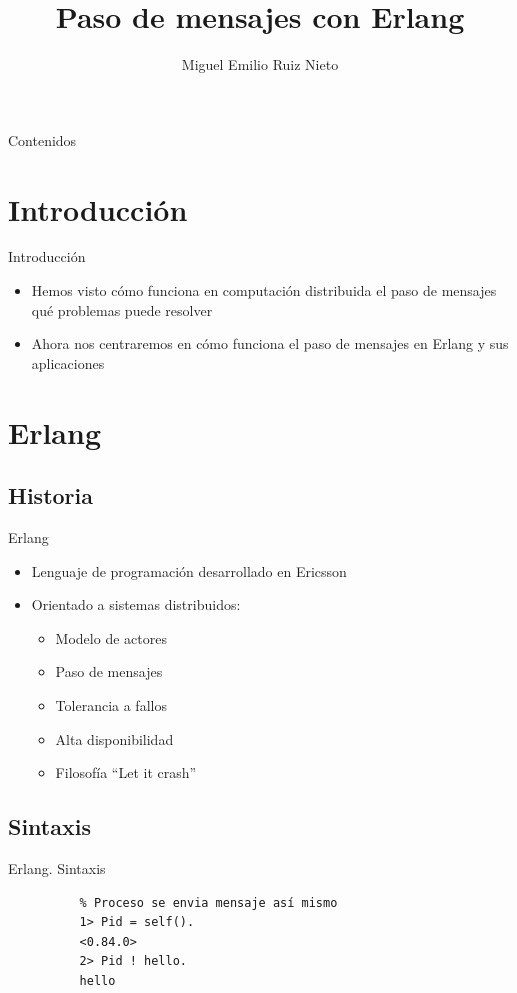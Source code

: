 \documentclass{beamer}
\title[CAP]{Paso de mensajes con Erlang}
\author[M. Ruiz (UCM)]{Miguel Emilio Ruiz Nieto}
\date{\mydate}
\begin{document}
  \begin{frame}
    \titlepage
  \end{frame}

  \begin{frame}{Contenidos}
    \tableofcontents[hideallsubsections]
  \end{frame}

  \section{Introducción}
  \begin{frame}{Introducción}
    \begin{itemize}
      \item Hemos visto cómo funciona en computación distribuida el paso de
      mensajes qué problemas puede resolver
      \item Ahora nos centraremos en cómo funciona el paso de mensajes en Erlang
      y sus aplicaciones
    \end{itemize}
  \end{frame}

  \section{Erlang}
    \subsection{Historia}
      \begin{frame}{Erlang}
        \begin{itemize}
          \item Lenguaje de programación desarrollado en Ericsson
          \item Orientado a sistemas distribuidos:
          \begin{itemize}
            \item Modelo de actores
            \item Paso de mensajes
            \item Tolerancia a fallos
            \item Alta disponibilidad
            \item Filosofía ``Let it crash''
          \end{itemize}
        \end{itemize}
      \end{frame}

      \subsection{Sintaxis}
      \begin{frame}[fragile]{Erlang. Sintaxis}
        \begin{verbatim}
          % Proceso se envia mensaje así mismo
          1> Pid = self().
          <0.84.0>
          2> Pid ! hello.
          hello
        \end{verbatim}
      \end{frame}
\end{document}
